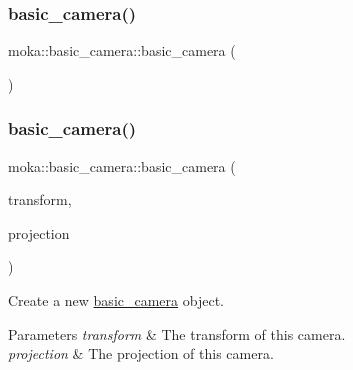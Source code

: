 \mbox{\label{classmoka_1_1basic__camera_a357eb167fe7dad8a1d65a92311e1342e}} 
\subsubsection{\texorpdfstring{basic\_camera()}{basic\_camera()}\hspace{0.1cm}{\footnotesize\ttfamily [1/2]}}
{\footnotesize\ttfamily moka\+::basic\+\_\+camera\+::basic\+\_\+camera (\begin{DoxyParamCaption}{ }\end{DoxyParamCaption})\hspace{0.3cm}{\ttfamily [default]}}

\mbox{\label{classmoka_1_1basic__camera_a3305373cc74a56d5b40cee482959172e}} 
\subsubsection{\texorpdfstring{basic\_camera()}{basic\_camera()}\hspace{0.1cm}{\footnotesize\ttfamily [2/2]}}
{\footnotesize\ttfamily moka\+::basic\+\_\+camera\+::basic\+\_\+camera (\begin{DoxyParamCaption}\item[{const \mbox{\hyperlink{classmoka_1_1transform}{transform}} \&}]{transform,  }\item[{const \mbox{\hyperlink{namespacemoka_aed2224bc0e5b79e57a8975ded94ee1aaabe14b41eb96410ea28b32bc138d885ae}{glm\+::mat4}} \&}]{projection }\end{DoxyParamCaption})}



Create a new \mbox{\hyperlink{classmoka_1_1basic__camera}{basic\+\_\+camera}} object. 


\begin{DoxyParams}{Parameters}
{\em transform} & The transform of this camera. \\
\hline
{\em projection} & The projection of this camera. \\
\hline
\end{DoxyParams}



